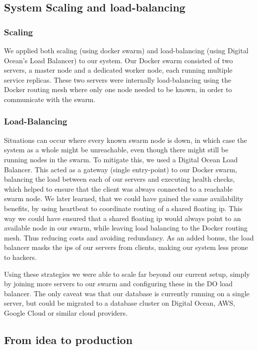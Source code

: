 \subsection{System Scaling and load-balancing}
\subsubsection{Scaling}
We applied both scaling (using docker swarm) and load-balancing (using Digital Ocean's Load Balancer) to our system. 
Our Docker swarm consisted of two servers, a master node and a dedicated worker node, each running multiple service replicas. 
These two servers were internally load-balancing using the Docker routing mesh where only one node needed to be known, in order to communicate with the swarm.

\subsubsection{Load-Balancing}
Situations can occur where every known swarm node is down, in which case the system as a whole might be unreachable, even though there might still be running nodes in the swarm.
\newline
To mitigate this, we used a Digital Ocean Load Balancer. This acted as a gateway (single entry-point) to our Docker swarm, balancing the load between each of our servers and executing health checks, which helped to ensure that the client was always connected to a reachable swarm node.
\newline
We later learned, that we could have gained the same availability benefits, by using heartbeat to coordinate routing of a shared floating ip.
This way we could have ensured that a shared floating ip would always point to an available node in our swarm, while leaving load balancing to the Docker routing mesh. Thus reducing costs and avoiding redundancy.
\newline
As an added bonus, the load balancer masks the ips of our servers from clients, making our system less prone to hackers.

Using these strategies we were able to scale far beyond our current setup, simply by joining more servers to our swarm and configuring these in the DO load balancer.
The only caveat was that our database is currently running on a single server, but could be migrated to a database cluster on Digital Ocean, AWS, Google Cloud or similar cloud providers.

\subsection{From idea to production}

